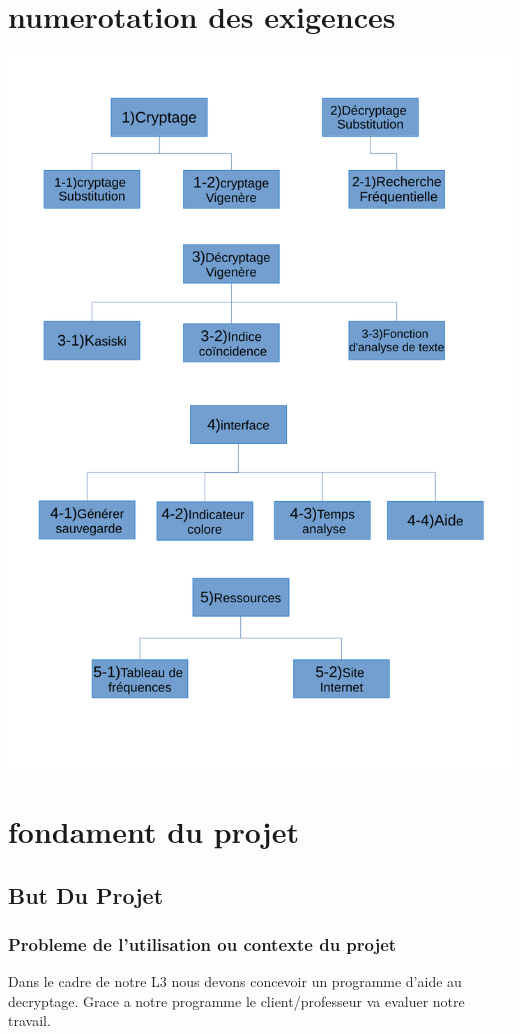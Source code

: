 \documentclass[a4]{article}
\begin{document}
		\section{numerotation des exigences}
				\includegraphics[scale=0.5]{Untit.pdf} \\
		
	\section{fondament du projet}
		\subsection{But Du Projet} 
			\subsubsection{Probleme de l'utilisation ou contexte du projet}
				Dans le cadre de notre L3 nous devons concevoir un programme d'aide au decryptage.
				Grace a notre programme le client/professeur va evaluer notre travail.
\end{document}
